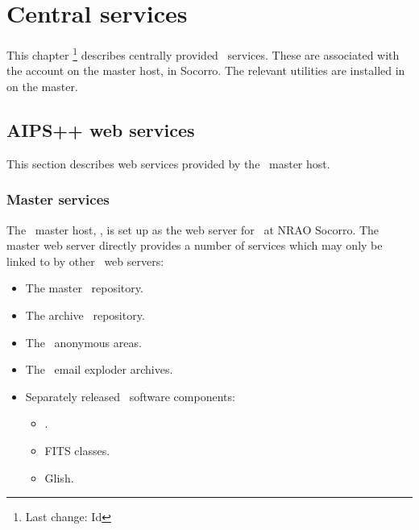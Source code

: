 \chapter{Central services}
\label{Central services}

This chapter \footnote{Last change:
$ $Id$ $}
describes centrally provided \aipspp\ services.  These are associated with
the  account on the master host,  in
Socorro.  The relevant utilities are installed in  on the
master.

 
\section{AIPS++ web services}
\label{web services}

This section describes web services provided by the \aipspp\ master host.

\subsection*{Master services}

The \aipspp\ master host, , is set up as the web server
for \aipspp\ at NRAO Socorro.  The master web server directly provides a
number of services which may only be linked to by other \aipspp\ web servers:

\begin{itemize}
\item
   The master \rcs\ repository.

\item
   The archive \rcs\ repository.

\item
   The \aipspp\ anonymous  areas.

\item
   The \aipspp\ email exploder archives.

\item
   Separately released \aipspp\ software components:
   \begin{itemize}
   \item
       .
   \item
       FITS classes.
   \item
       Glish.
   \end{itemize}
\end{itemize}

